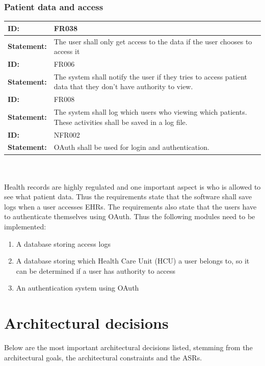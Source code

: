 \documentclass{article}
\begin{document}
\subsubsection{Patient data and access}

\begin{tabularx}{\linewidth}{| l | X |}
 \hline
 \textbf{ID:} & FR038  \\ 
 \hline
 \textbf{Statement:} & The user shall only get access to the data if the user chooses to access it
  \\ 
 \hline

 \textbf{ID:} & FR006  \\ 
 \hline
 \textbf{Statement:} & The system shall notify the user if they tries to access patient data that they don't have authority to view.\\ 
 \hline

 \textbf{ID:} & FR008  \\ 
 \hline
 \textbf{Statement:} & The system shall log which users who viewing which patients. These activities shall be saved in a log file.
\\ 
 \hline

 \textbf{ID:} & NFR002  \\ 
 \hline
 \textbf{Statement:} & OAuth shall be used for login and authentication.
 \\ 
 \hline
\end{tabularx}
\\ \\

Health records are highly regulated and one important aspect is who is allowed to see what patient data. Thus the requirements state that the software shall save logs when a user accesses EHRs. The requirements also state that the users have to authenticate themselves using OAuth. 
Thus the following modules need to be implemented:

\begin{enumerate}[label=(\roman*)]
\item A database storing access logs
\item A database storing which Health Care Unit (HCU) a user belongs to, so it can be determined if a user has authority to access
\item An authentication system using OAuth
\end{enumerate}



\section{Architectural decisions}
Below are the most important architectural decisions listed, stemming from the architectural goals, the architectural constraints and the ASRs.
\end{document}
